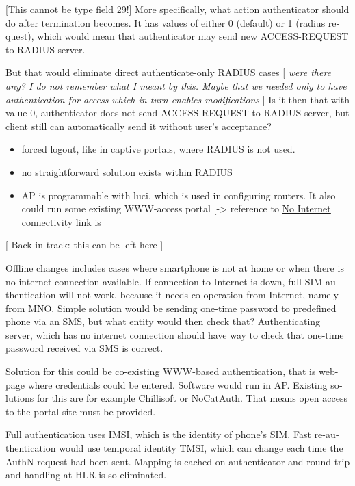 \documentclass[12pt,a4paper,english]{tutthesis}
\begin{document}
\begin{otherlanguage}{english}
[This cannot be type field 29!]  More specifically, what action
authenticator should do after termination becomes. It has values of
either 0 (default) or 1 (radius request), which would mean that
authenticator may send new ACCESS-REQUEST to RADIUS server.

But that would eliminate direct authenticate-only RADIUS cases
  [ \emph{were there}
 \emph{any? I do not remember what I meant}
 \emph{by this. Maybe that we needed only}
 \emph{to have authentication for access} 
 \emph{which in turn enables modifications} ]
Is it then that with value 0, authenticator does not send
ACCESS-REQUEST to RADIUS server, but client still can automatically send it without 
user's acceptance?
\begin{itemize}
\item forced logout, like in captive portals, where RADIUS is not used.
\item no straightforward solution exists within RADIUS
\item AP is programmable with luci, which is used in configuring routers. It also could run some existing WWW-access
portal [-> reference to \hyperref[text:nointernet]{No Internet connectivity} link is
\end{itemize}








[ Back in track: this can be left here ]

Offline changes includes cases where smartphone is not at home or when
there is no internet connection available.
If connection to Internet is down, full SIM authentication will not
work, because it needs co-operation from Internet, namely from MNO.
Simple solution would be sending one-time password to predefined
phone via an SMS, but what entity would then check that?
Authenticating server, which has no internet connection should 
have way to check that one-time password received via SMS is correct.

Solution for this could be co-existing WWW-based authentication, that
is web-page where credentials could be entered.
Software would run in AP. Existing solutions for this are for example
Chillisoft or NoCatAuth. That means open access to the
portal site must be provided.


Full authentication uses IMSI, which is the identity of phone's SIM.
Fast re-authentication would use temporal identity TMSI, which 
can change each time the AuthN request had been sent. Mapping
is cached on authenticator and round-trip and handling at HLR is
so eliminated. 


\end{otherlanguage}
\end{document}
